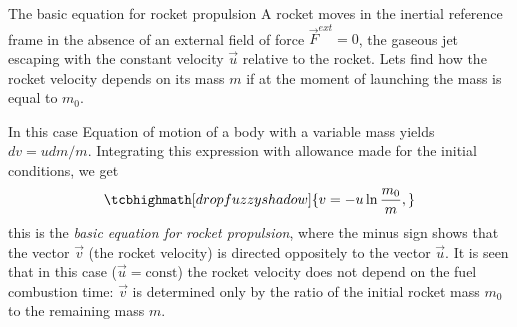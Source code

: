 \documentclass[18pt]{LectMechanics}
\begin{document}
\begin{frame}{The basic equation for rocket propulsion}{}
A rocket moves in the inertial reference frame in the absence of an external field of force $\vec F^{ext} = 0$, the gaseous jet escaping with the constant velocity $\vec u$ relative to the rocket. Lets find how the rocket velocity depends on its mass $m$ if at the moment of launching the mass is equal to $m_0$. 

In this case Equation of motion of a body with a variable mass yields $dv = u dm/m$. Integrating this expression with allowance made for the initial conditions, we get 
\begin{equation*}
	\tcbhighmath[drop fuzzy shadow]{v = - u \ln\frac{m_0}{m},}
\end{equation*}
this is the \emph{basic equation for rocket propulsion}, where the minus sign shows that the vector $\vec v$ (the rocket velocity) is directed oppositely to the vector $\vec u$. It is seen that in this case ($\vec u = \mathrm{const}$) the rocket velocity does not depend on the fuel combustion time: $\vec v$ is determined only by the ratio of the initial rocket mass $m_0$ to the remaining mass $m$.

\end{frame}
\end{document}
